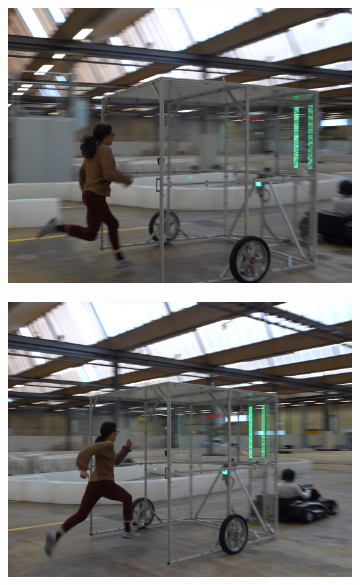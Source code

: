 \documentclass[a4paper,12pt,oneside]{book}
\begin{document}
\begin{figure}
\begin{subfigure}[b]{0.32\textwidth}
        \includegraphics[width=\textwidth]{SteadyState/ss7.png}
    \end{subfigure}
    \hfill
    \begin{subfigure}[b]{0.32\textwidth}
        \includegraphics[width=\textwidth]{SteadyState/ss8.png}
    \end{subfigure}
    \hfill
    \begin{subfigure}[b]{0.32\textwidth}

\end{subfigure}
\end{figure}
\end{document}
